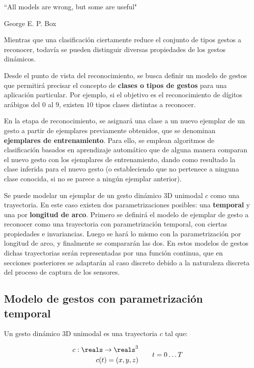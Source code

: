 
\epigraph{``All models are wrong, but some are useful"}{George E. P. Box}


Mientras que una clasificación ciertamente reduce el conjunto de tipos gestos a reconocer, todavía se pueden distinguir diversas propiedades de los gestos dinámicos.  

Desde el punto de vista del reconocimiento, se busca definir un modelo de gestos que permitirá precisar el concepto de \textbf{clases o tipos de gestos} para una aplicación particular. Por ejemplo, si el objetivo es el reconocimiento de dígitos arábigos del $0$ al $9$, existen $10$ tipos clases distintas a reconocer. 

En la etapa de reconocimiento, se asignará una clase a un nuevo ejemplar de un gesto a partir de ejemplares previamente obtenidos, que se denominan \textbf{ejemplares de entrenamiento}. Para ello, se emplean algoritmos de clasificación basados en aprendizaje automático que de alguna manera comparan el nuevo gesto con los ejemplares de entrenamiento, dando como resultado la clase inferida para el nuevo gesto (o estableciendo que no pertenece a ninguna clase conocida, si no se parece a ningún ejemplar anterior). 



Se puede modelar un ejemplar de un gesto dinámico 3D unimodal $c$ como una trayectoria. En este caso existen dos parametrizaciones posibles: una \textbf{temporal} y una por \textbf{longitud de arco}. Primero se definirá el modelo de ejemplar de gesto a reconocer como una trayectoria con parametrización temporal, con ciertas propiedades e invariancias. Luego se hará lo mismo con la parametrización por longitud de arco, y finalmente se compararán las dos. En estos modelos de gestos dichas trayectorias serán representadas por una función continua, que en secciones posteriores se adaptarán al caso discreto debido a la naturaleza discreta del proceso de captura de los sensores.


\subsection{Modelo de gestos con parametrización temporal}


Un gesto dinámico 3D unimodal es una trayectoria $c$ tal que: 

\begin{equation}
  \begin{split}
    c : \reals \rightarrow \reals^3 \\
    c(t)=(x,y,z)
  \end{split}
  \quad \quad
  \begin{split}
    t=0 \dots T
  \end{split}
\end{equation}  
  
